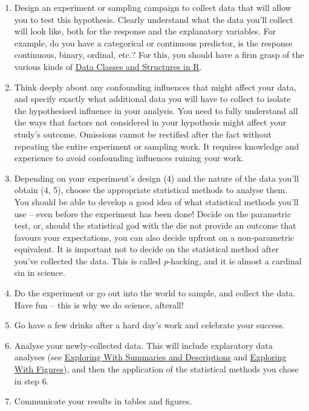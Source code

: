\documentclass[
  letterpaper,
]{book}
\begin{document}
\begin{enumerate}
\def\labelenumi{\arabic{enumi}.}
\setcounter{enumi}{3}
\item
  Design an experiment or sampling campaign to collect data that will
  allow you to test this hypothesis. Clearly understand what the data
  you'll collect will look like, both for the response and the
  explanatory variables. For example, do you have a categorical or
  continuous predictor, is the response continuous, binary, ordinal,
  etc.? For this, you should have a firm grasp of the various kinds of
  \href{https://tangledbank.netlify.app/BCB744/basic_stats/01-data-in-R.html}{Data
  Classes and Structures in R}.
\item
  Think deeply about any confounding influences that might affect your
  data, and specify exactly what additional data you will have to
  collect to isolate the hypothesised influence in your analysis. You
  need to fully understand all the ways that factors not considered in
  your hypothesis might affect your study's outcome. Omissions cannot be
  rectified after the fact without repeating the entire experiment or
  sampling work. It requires knowledge and experience to avoid
  confounding influences ruining your work.
\item
  Depending on your experiment's design (4) and the nature of the data
  you'll obtain (4, 5), choose the appropriate statistical methods to
  analyse them. You should be able to develop a good idea of what
  statistical methods you'll use -- even before the experiment has been
  done! Decide on the parametric test, or, should the statistical god
  with the die not provide an outcome that favours your expectations,
  you can also decide upfront on a non-parametric equivalent. It is
  important not to decide on the statistical method after you've
  collected the data. This is called \emph{p}-hacking, and it is almost
  a cardinal sin in science.
\item
  Do the experiment or go out into the world to sample, and collect the
  data. Have fun -- this is why we do science, afterall!
\item
  Go have a few drinks after a hard day's work and celebrate your
  success.
\item
  Analyse your newly-collected data. This will include explaratory data
  analyses (see
  \href{https://tangledbank.netlify.app/BCB744/basic_stats/02-summarise-and-describe.html}{Exploring
  With Summaries and Descriptions} and
  \href{https://tangledbank.netlify.app/BCB744/basic_stats/03-visualise.html}{Exploring
  With Figures}), and then the application of the statistical methods
  you chose in step 6.
\item
  Communicate your results in tables and figures.
\end{enumerate}
\end{document}
